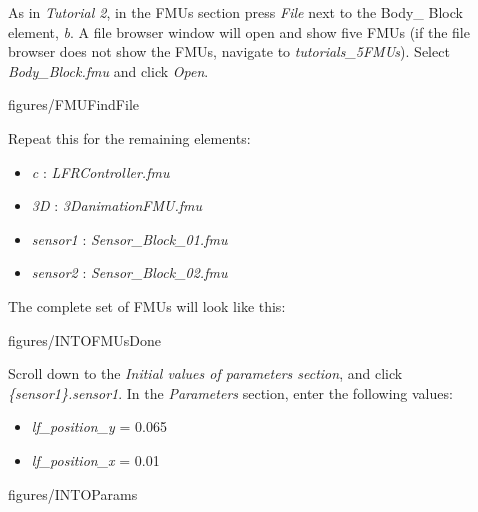 \documentclass[11pt,a4paper]{../tutorial}
\begin{document}
\begin{instructions}
\item As in \emph{Tutorial 2}, in the FMUs section press \emph{File} next to the Body\_ Block element, \emph{b}. A file browser window will open and show five FMUs (if the file browser does not show the FMUs, navigate to \emph{tutorials\_5\pathsep{}FMUs}). Select \emph{Body\_Block.fmu} and click \emph{Open}.

    \begin{annotation}[width=0.8\linewidth]{figures/FMUFindFile}
    \end{annotation}

\item Repeat this for the remaining elements:
    \begin{itemize}
        \item \emph{c} : \emph{LFRController.fmu}
        \item \emph{3D} : \emph{3DanimationFMU.fmu}
        \item \emph{sensor1} : \emph{Sensor\_Block\_01.fmu}
    \item \emph{sensor2} : \emph{Sensor\_Block\_02.fmu}
    \end{itemize}

    The complete set of FMUs will look like this:

    \begin{annotation}[width=0.85\linewidth,trim=0 0 0 0,clip]{figures/INTOFMUsDone}
    \end{annotation}

\newpage
\item Scroll down to the \emph{Initial values of parameters section}, and click \emph{\{sensor1\}.sensor1}. In the \emph{Parameters} section, enter the following values:

    \begin{itemize}
        \item \emph{lf\_position\_y} = 0.065
        \item \emph{lf\_position\_x} = 0.01
    \end{itemize}

    \begin{annotation}[width=0.8\linewidth]{figures/INTOParams}
    \end{annotation}


\end{instructions}
\end{document}
